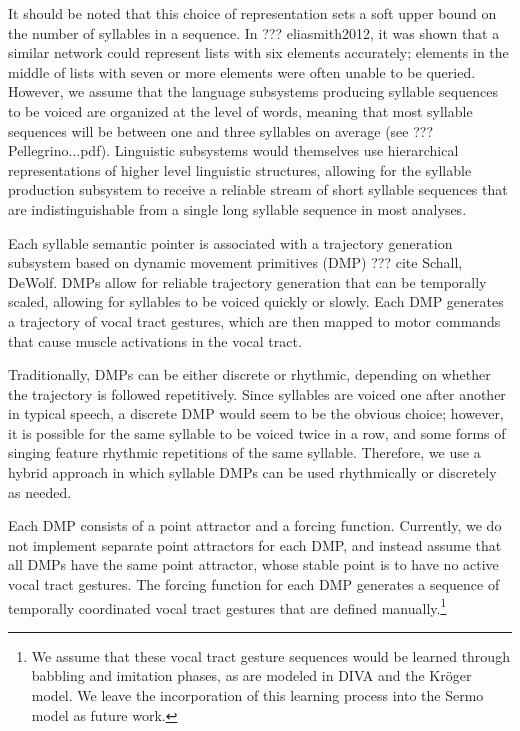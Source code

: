 It should be noted that
this choice of representation
sets a soft upper bound
on the number of syllables in a sequence.
In ??? eliasmith2012,
it was shown that a similar network
could represent lists with six elements accurately;
elements in the middle of
lists with seven or more elements
were often unable to be queried.
However, we assume that the
language subsystems producing
syllable sequences to be voiced
are organized at the level of words,
meaning that most syllable sequences
will be between one and three syllables
on average (see ??? Pellegrino...pdf).
Linguistic subsystems would themselves
use hierarchical representations
of higher level linguistic structures,
allowing for the syllable production subsystem
to receive a reliable stream of
short syllable sequences
that are indistinguishable from
a single long syllable sequence
in most analyses.

Each syllable semantic pointer
is associated with a
trajectory generation subsystem
based on dynamic movement primitives (DMP)
??? cite Schall, DeWolf.
DMPs allow for reliable trajectory generation
that can be temporally scaled,
allowing for syllables to be voiced
quickly or slowly.
Each DMP generates a trajectory
of vocal tract gestures,
which are then mapped to
motor commands that cause
muscle activations in the vocal tract.

Traditionally, DMPs can be either discrete or rhythmic,
depending on whether the trajectory
is followed repetitively.
Since syllables are voiced
one after another in typical speech,
a discrete DMP would seem to be
the obvious choice;
however, it is possible for
the same syllable to be voiced
twice in a row,
and some forms of singing
feature rhythmic repetitions
of the same syllable.
Therefore, we use a hybrid approach
in which syllable DMPs can be used rhythmically
or discretely as needed.

Each DMP consists of a point attractor
and a forcing function.
Currently, we do not implement
separate point attractors for each DMP,
and instead assume that all DMPs
have the same point attractor,
whose stable point is
to have no active vocal tract gestures.
The forcing function for each DMP
generates a sequence of temporally coordinated
vocal tract gestures
that are defined manually.\footnote{
  We assume that these vocal tract gesture sequences
  would be learned through babbling and imitation phases,
  as are modeled in DIVA and the Kr\"{o}ger model.
  We leave the incorporation of this learning process
  into the Sermo model as future work.}

